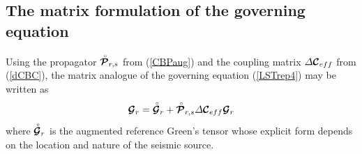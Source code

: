
\subsection{The matrix formulation of the governing equation }
Using the propagator ${\rf{\CB P}}_{r,s}$ from (\ref{CBPaug}) and the coupling 
matrix ${\mit \Delta} {\CB C}_{eff}$ from (\ref{dCBC}), 
the matrix analogue of the governing equation (\ref{LSTrep4}) may be written as
\begin{equation} \label{LSTrep5}
{{\CB G}}_{r}={\rf{\CB G}}_{r}+{\rf{\CB P}}_{r,s}{\mit \Delta} {\CB C}_{eff} {\CB G}_{r}
\end{equation} 
where ${\rf{\CB G}}_{r}$ is the augmented reference Green's tensor whose 
explicit form depends on the location and nature of the seismic source.



